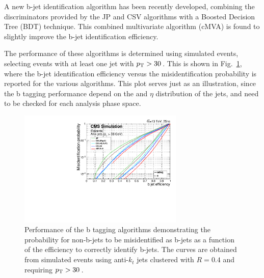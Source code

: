 A new b-jet identification algorithm has been recently developed, combining the discriminators provided by the JP and CSV algorithms with a Boosted Decision Tree (BDT) technique. This combined multivariate algorithm (cMVA) is found to slightly improve the b-jet identification efficiency.

The performance of these algorithms is determined using simulated \ttbar events, selecting events with at least one jet with $p_\mathrm{T} > 30$\,\GeV. This is shown in Fig.~\ref{fig:btagperf}, where the b-jet identification efficiency versus the misidentification probability is reported for the various algorithms. This plot serves just as an illustration, since the b tagging performance depend on the \pt and $\eta$ distribution of the jets, and need to be checked for each analysis phase space.

\begin{figure}[htb]
\centering
\includegraphics[width=0.7\textwidth]{images/btagperf.pdf}
\caption{Performance of the b tagging algorithms demonstrating the probability for non-b-jets to be misidentified as b-jets as a function of the efficiency to correctly identify b-jets. The curves are obtained from simulated \ttbar events using anti-$k_t$ jets clustered with $R=0.4$ and requiring $p_\mathrm{T}>30$\,\GeV.}\label{fig:btagperf}
\end{figure}


